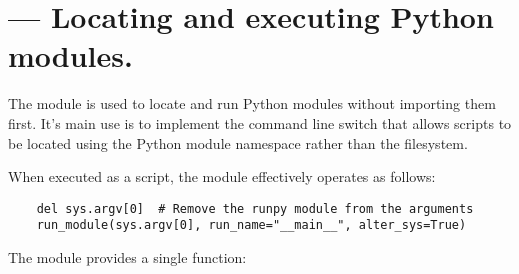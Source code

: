 \section{ ---
         Locating and executing Python modules.}





The  module is used to locate and run Python modules
without importing them first. It's main use is to implement the
 command line switch that allows scripts to be located
using the Python module namespace rather than the filesystem.

When executed as a script, the module effectively operates as follows:
\begin{verbatim}
    del sys.argv[0]  # Remove the runpy module from the arguments
    run_module(sys.argv[0], run_name="__main__", alter_sys=True)
\end{verbatim}

The  module provides a single function:

